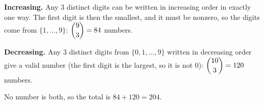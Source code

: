 \textbf{Increasing.} Any $3$ distinct digits can be written in increasing order in exactly one way. The first digit is then the smallest, and it must be nonzero, so the digits come from $\{1,\ldots,9\}$: $\dbinom93=84$ numbers.

\textbf{Decreasing.} Any $3$ distinct digits from $\{0,1,\ldots,9\}$ written in decreasing order give a valid number (the first digit is the largest, so it is not $0$): $\dbinom{10}3=120$ numbers.

No number is both, so the total is $84+120=\boxed{204}$.
